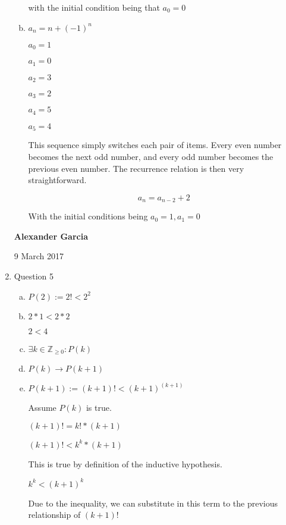 \documentclass[11pt]{article}
\begin{document}
\begin{enumerate}
\begin{enumerate}[(a)]
				with the initial condition being that $a_0 = 0$\\

			\item $a_n = n + (-1)^n$

				$a_0 = 1$

				$a_1 = 0$

				$a_2 = 3$

				$a_3 = 2$

				$a_4 = 5$

				$a_5 = 4$

				This sequence simply switches each pair of items. Every even number
				becomes the next odd number, and every odd number becomes the
				previous even number. The recurrence relation is then very
				straightforward.

				$$a_n = a_{n-2} + 2$$

				With the initial conditions being $a_0 = 1, a_1 = 0$ \\

		\end{enumerate}

	\newpage

	\textbf{Alexander Garcia}

	9 March 2017 \\

	\item Question 5

		\begin{enumerate}[(a)]

			\item $P(2):= 2! < 2^2$

			\item $2*1 < 2 * 2$

				$2 < 4$

			\item $\exists k \in \mathbb{Z}_{\geq 0}: P(k)$

			\item $P(k) \rightarrow P(k+1)$

			\item $P(k+1):= (k+1)! < (k+1)^{(k+1)}$

				Assume $P(k)$ is true.

				$(k+1)! = k! * (k+1)$

				$(k+1)! < k^k * (k+1)$

				This is true by definition of the inductive hypothesis.

				$k^k < (k+1)^k$

				Due to the inequality, we can substitute in this term
				to the previous relationship of $(k+1)!$


\end{enumerate}
\end{enumerate}
\end{document}
